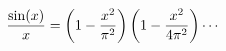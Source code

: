 \documentclass[preview]{standalone}
\begin{document}
\begin{align*}
\special{dvisvgm:raw <g id='unique000'>}\frac{\sin(x)}{x} = \left(1 - \frac{x^2}{\pi^2}\right)\left(1 - \frac{x^2}{4\pi^2}\right)\cdots\special{dvisvgm:raw </g>}
\end{align*}
\end{document}
